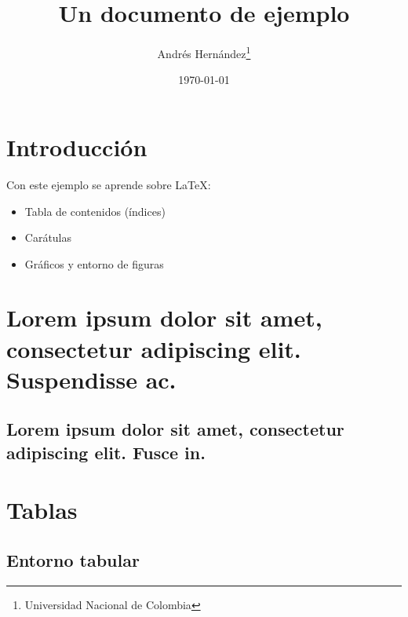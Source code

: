 \documentclass{article}
\begin{document}
\title{Un documento de ejemplo} %
\date{\today} %
\author{Andrés Hernández\thanks{Universidad Nacional de Colombia}} %

\maketitle %

\newpage %

\tableofcontents %

\listoffigures %

\listoftables %

\newpage %

\section*{Introducción}

Con este ejemplo se aprende sobre LaTeX:

\begin{itemize}
  \item Tabla de contenidos (índices)
  \item Carátulas
  \item Gráficos y entorno de figuras
\end{itemize}

\section{Lorem ipsum dolor sit amet, consectetur adipiscing elit. Suspendisse ac.}

\subsection[Fusce in]{Lorem ipsum dolor sit amet, consectetur adipiscing elit. Fusce in.}

\section{Tablas}

\subsection{Entorno tabular}
\end{document}
